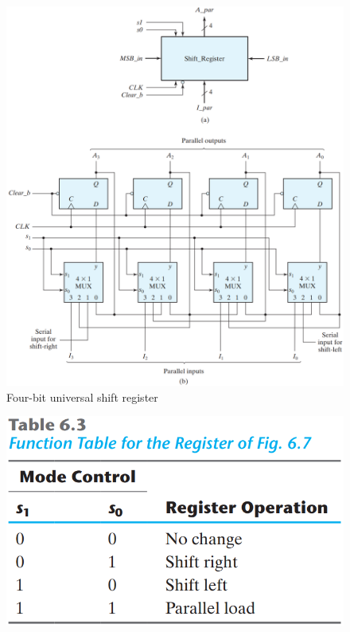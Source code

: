 \begin{figure}[H]
  \centering
  \includegraphics[width=\linewidth]{img/fig-6.7.png}
  \caption{Four-bit universal shift register}
  \label{fig:6.7}
\end{figure}

\vspace*{\fill}
\columnbreak

\begin{figure}[H]
  \centering
  \includegraphics[width=\linewidth]{img/table-6.3.png}
  \label{table:6.3}
\end{figure}

